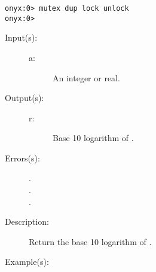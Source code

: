 \begin{description}
\begin{description}
\begin{verbatim}
onyx:0> mutex dup lock unlock
onyx:0>
		\end{verbatim}
	\end{description}
\label{systemdict:log}
\item[{\onyxop{a}{log}{r}}: ]
	\begin{description}\item[]
	\item[Input(s): ]
		\begin{description}\item[]
		\item[a: ]
			An integer or real.
		\end{description}
	\item[Output(s): ]
		\begin{description}\item[]
		\item[r: ]
			Base 10 logarithm of .
		\end{description}
	\item[Errors(s): ]
		\begin{description}\item[]
		\item[.]
		\item[.]
		\item[.]
		\end{description}
	\item[Description: ]
		Return the base 10 logarithm of .
	\item[Example(s): ]\begin{verbatim}


\end{verbatim}
\end{description}
\end{description}
